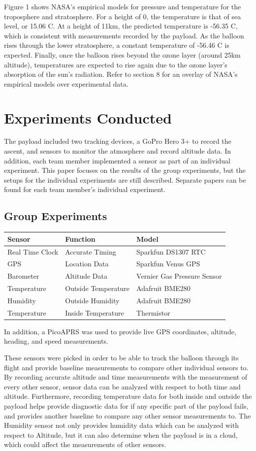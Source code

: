 \documentclass[12pt,]{article}
\begin{document}
Figure 1 shows NASA's empirical models for pressure and temperature for
the troposphere and stratosphere. For a height of 0, the temperature is
that of sea level, or 15.06 \degree C. At a height of 11km, the
predicted temperature is -56.35 \degree C, which is consistent with
measurements recorded by the payload. As the balloon rises through the
lower stratosphere, a constant temperature of -56.46 \degree C is
expected. Finally, once the balloon rises beyond the ozone layer (around
25km altitude), temperatures are expected to rise again due to the ozone
layer's absorption of the sun's radiation. Refer to section 8 for an
overlay of NASA's empirical models over experimental data.

\section{Experiments Conducted}\label{experiments-conducted}

The payload included two tracking devices, a GoPro Hero 3+ to record the
ascent, and sensors to monitor the atmosphere and record altitude data.
In addition, each team member implemented a sensor as part of an
individual experiment. This paper focuses on the results of the group
experiments, but the setups for the individual experiments are still
described. Separate papers can be found for each team member's
individual experiment.

\subsection{Group Experiments}\label{group-experiments}

\begin{longtable}[]{@{}lll@{}}
\toprule
Sensor & Function & Model\tabularnewline
\midrule
\endhead
Real Time Clock & Accurate Timing & Sparkfun DS1307 RTC\tabularnewline
GPS & Location Data & Sparkfun Venus GPS\tabularnewline
Barometer & Altitude Data & Vernier Gas Pressure Sensor\tabularnewline
Temperature & Outside Temperature & Adafruit BME280\tabularnewline
Humidity & Outside Humidity & Adafruit BME280\tabularnewline
Temperature & Inside Temperature & Thermistor\tabularnewline
\bottomrule
\end{longtable}

In addition, a PicoAPRS was used to provide live GPS coordinates,
altitude, heading, and speed measurements.

These sensors were picked in order to be able to track the balloon
through its flight and provide baseline measurements to compare other
individual sensors to. By recording accurate altitude and time
measurements with the measurement of every other sensor, sensor data can
be analyzed with respect to both time and altitude. Furthermore,
recording temperature data for both inside and outside the payload helps
provide diagnostic data for if any specific part of the payload fails,
and provides another baseline to compare any other sensor measurements
to. The Humidity sensor not only provides humidity data which can be
analyzed with respect to Altitude, but it can also determine when the
payload is in a cloud, which could affect the measurements of other
sensors.
\end{document}
